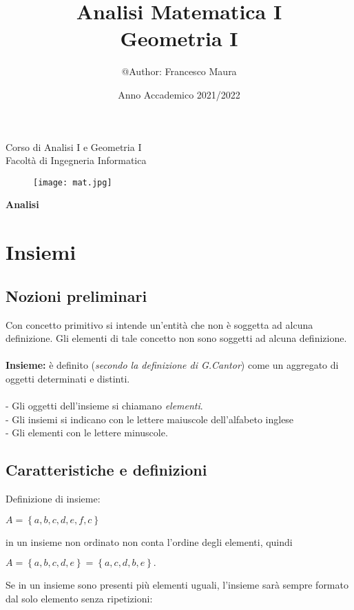 \documentclass[a4paper]{article}
\begin{document}
	\title{\textbf{Analisi Matematica I \\ Geometria I}}
	\date{Anno Accademico 2021/2022}
	\maketitle
	
	\begin{center}
		Corso di Analisi I e Geometria I\\ Facoltà di Ingegneria Informatica\\
		\vspace{1cm}
		\author{@Author: Francesco Maura}
	\end{center}
	\begin{figure}[htp]
		\centering
		\texttt{[image: mat.jpg]}
	\end{figure}

\newpage
\tableofcontents
\newpage
\begin{center}
	{\LARGE \textbf{Analisi}}
\end{center}
\section[Analisi I: Insiemi]{Insiemi}
\subsection{Nozioni preliminari}
Con concetto primitivo si intende un'entità che non è soggetta ad alcuna definizione. Gli elementi di tale concetto non sono soggetti ad alcuna definizione.
\\
\\
\textbf{Insieme: }è definito (\textit{secondo la definizione di G.Cantor}) come un aggregato di oggetti determinati e distinti.
\\
\\
- Gli oggetti dell'insieme si chiamano \textit{elementi}.
\\
- Gli insiemi si indicano con le lettere maiuscole dell'alfabeto inglese
\\
- Gli elementi con le lettere minuscole.
\\
\subsection{Caratteristiche e definizioni}
Definizione di insieme:

\begin{center}
	\begin{math}
	A = \left\lbrace a,b,c,d,e,f,c\right\rbrace 
\end{math}
\end{center}
in un insieme non ordinato non conta l'ordine degli elementi, quindi
\\
\begin{center}
	\begin{math}
		A = \left\lbrace a,b,c,d,e\right\rbrace = \left\lbrace a,c,d,b,e\right\rbrace.
	\end{math}
\end{center}
Se in un insieme sono presenti più elementi uguali, l'insieme sarà sempre formato dal solo elemento senza ripetizioni:
\end{document}
